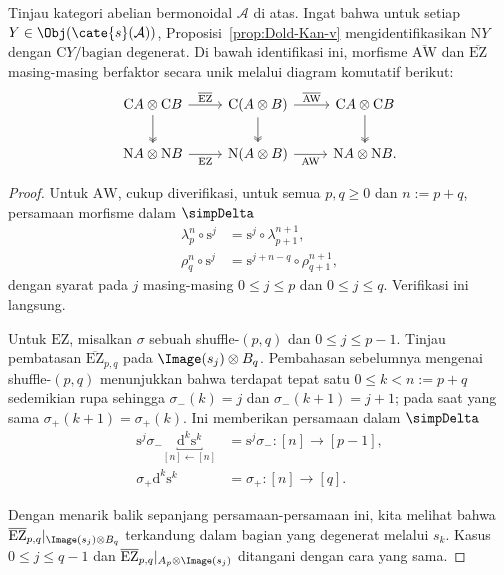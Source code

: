 \begin{lemma}\label{prop:EZ-aux}
	Tinjau kategori abelian bermonoidal $\mathcal{A}$ di atas. Ingat bahwa
	untuk setiap $Y\in\Obj(\cate{s}(\mathcal{A}))$,
	Proposisi~\ref{prop:Dold-Kan-v} mengidentifikasikan $\mathrm{N}Y$
	dengan $\mathrm{C}Y/\text{bagian degenerat}$. Di bawah identifikasi ini,
	morfisme $\overline{\mathrm{AW}}$ dan $\overline{\mathrm{EZ}}$ masing-masing
	berfaktor secara unik melalui diagram komutatif berikut:
	\[\begin{tikzcd}
		\mathrm{C}A \otimes \mathrm{C}B \arrow[r, "{\overline{\mathrm{EZ}}}"] \arrow[twoheadrightarrow, d] & \mathrm{C}(A \otimes B) \arrow[r, "{\overline{\mathrm{AW}}}"] \arrow[twoheadrightarrow, d] & \mathrm{C}A \otimes \mathrm{C}B \arrow[twoheadrightarrow, d] \\
		\mathrm{N}A \otimes \mathrm{N}B \arrow[r, "\mathrm{EZ}"'] & \mathrm{N}(A \otimes B) \arrow[r, "{\mathrm{AW}}"'] & \mathrm{N}A \otimes \mathrm{N}B .
	\end{tikzcd}\]
\end{lemma}
\begin{proof}
	Untuk $\mathrm{AW}$, cukup diverifikasi, untuk semua
	$p,q\geq0$ dan $n:=p+q$, persamaan morfisme dalam $\simpDelta$
	\begin{align*}
		\lambda^n_p \circ \mathrm{s}^j & = \mathrm{s}^j \circ \lambda^{n+1}_{p+1}, \\
		\rho^n_q \circ \mathrm{s}^j & = \mathrm{s}^{j+n-q} \circ \rho^{n+1}_{q+1},
	\end{align*}
	dengan syarat pada $j$ masing-masing $0\leq j\leq p$ dan
	$0\leq j\leq q$. Verifikasi ini langsung.

	Untuk $\mathrm{EZ}$, misalkan $\sigma$ sebuah shuffle-$(p,q)$ dan
	$0\leq j\leq p-1$. Tinjau pembatasan
	$\overline{\mathrm{EZ}}_{p,q}$ pada $\Image(s_j)\otimes B_q$.
	Pembahasan sebelumnya mengenai shuffle-$(p,q)$ menunjukkan bahwa
	terdapat tepat satu $0\leq k<n:=p+q$ sedemikian rupa sehingga
	$\sigma_-(k)=j$ dan $\sigma_-(k+1)=j+1$; pada saat yang sama
	$\sigma_+(k+1)=\sigma_+(k)$. Ini memberikan persamaan dalam
	$\simpDelta$
	\begin{align*}
		\mathrm{s}^j \sigma_- \underbracket{\mathrm{d}^k \mathrm{s}^k}_{[n] \leftarrow [n]} & = \mathrm{s}^j \sigma_- : [n] \to [p-1] , \\
		\sigma_+ \mathrm{d}^k \mathrm{s}^k & = \sigma_+ : [n] \to [q] .
	\end{align*}

	Dengan menarik balik sepanjang persamaan-persamaan ini, kita melihat bahwa
	$\overline{\mathrm{EZ}}_{p,q}|_{\Image(s_j)\otimes B_q}$ terkandung
	dalam bagian yang degenerat melalui $s_k$. Kasus $0\leq j\leq q-1$
	dan $\overline{\mathrm{EZ}}_{p,q}|_{A_p\otimes\Image(s_j)}$ ditangani
	dengan cara yang sama.
\end{proof}

